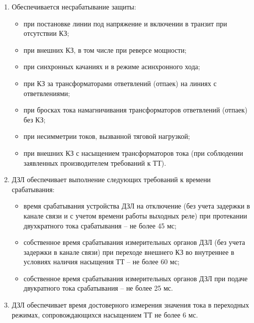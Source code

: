 \begin{enumerate}[label=\arabic{section}.\arabic{subsection}.\arabic{enumi}, labelsep=4pt, leftmargin=0pt, itemindent=57pt, itemsep=0pt, parsep=5pt]
\begin{enumerate}[label=\arabic{section}.\arabic{subsection}.\arabic{enumi}.\arabic*, labelsep=4pt, leftmargin=0em, itemindent=65pt, parsep=0pt]
\item 
Обеспечивается несрабатывание защиты:
\begin{itemize} 
\item при постановке линии под напряжение и включении в транзит при отсутствии КЗ;
\item при внешних КЗ, в том числе при реверсе мощности;
\item при синхронных качаниях и в режиме асинхронного хода;
\item при КЗ за трансформаторами ответвлений (отпаек) на линиях с ответвлениями;
\item при бросках тока намагничивания трансформаторов ответвлений (отпаек) без КЗ;
\item при несимметрии токов, вызванной тяговой нагрузкой;
\item при внешних КЗ с насыщением трансформаторов тока (при соблюдении заявленных производителем требований к ТТ).
\end{itemize}

\item 
ДЗЛ обеспечивает выполнение следующих требований к времени срабатывания:
\begin{itemize}
    \item время срабатывания устройства ДЗЛ на отключение (без учета задержки в канале связи и с учетом времени работы выходных реле) при протекании двухкратного тока срабатывания – не более 45 мс;
    \item собственное время срабатывания измерительных органов ДЗЛ (без учета задержки в канале связи) при переходе внешнего КЗ во внутреннее в условиях наличия насыщения ТТ – не более 60 мс;
	\item собственное время срабатывания измерительных органов ДЗЛ при подаче двукратного тока срабатывания – не более 25 мс.
\end{itemize}

\item
ДЗЛ обеспечивает время достоверного измерения значения тока в переходных режимах, сопровождающихся насыщением ТТ не более 6 мс.


\end{enumerate}
\end{enumerate}
